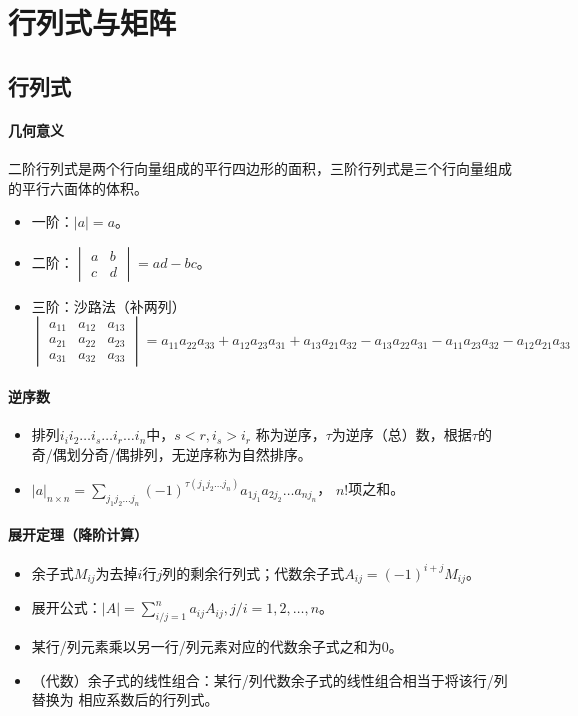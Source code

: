 \documentclass[
12pt, %
a4paper, 
oneside, %
headinclude,footinclude, %
]{scrartcl}
\begin{document}
\section{行列式与矩阵}
\subsection{行列式}
\paragraph{几何意义}
二阶行列式是两个行向量组成的平行四边形的面积，三阶行列式是三个行向量组成的平行六面体的体积。
\begin{itemize}
\item 一阶：$ |a| = a $。
\item 二阶：$\begin{vmatrix} a & b \\ c & d \end{vmatrix} = ad - bc $。
\item 三阶：沙路法（补两列）
$$
\begin{vmatrix}
a_{11} & a_{12} & a_{13} \\
a_{21} & a_{22} & a_{23} \\
a_{31} & a_{32} & a_{33}
\end{vmatrix}
= a_{11}a_{22}a_{33} + a_{12}a_{23}a_{31} + a_{13}a_{21}a_{32} 
- a_{13}a_{22}a_{31} - a_{11}a_{23}a_{32} - a_{12}a_{21}a_{33}
$$
\end{itemize}
\paragraph{逆序数}
\begin{itemize}
\item 排列$ i_i i_2 \dots i_s \dots i_r \dots i_n $中，$ s < r, i_s > i_r $
称为逆序，$ \tau $为逆序（总）数，根据$ \tau $的奇/偶划分奇/偶排列，无逆序称为自然排序。
\item $ |a|_{n \times n} = \sum_{j_1 j_2 \dots j_n}(-1)^{\tau(j_1 j_2 \dots j_n)} a_{1 j_{1}} a_{2 j_{2}} \dots a_{n j_{n}} $，
$ n! $项之和。
\end{itemize}
\paragraph{展开定理（降阶计算）}
\begin{itemize}
\item 余子式$ M_{ij} $为去掉$ i $行$ j $列的剩余行列式；代数余子式$ A_{ij} = (-1)^{i+j} M_{ij} $。
\item 展开公式：$ |A| = \sum_{i/j = 1}^n a_{ij}A_{ij}, j/i = 1, 2, \dots, n $。
\item 某行/列元素乘以另一行/列元素对应的代数余子式之和为$ 0 $。
\item （代数）余子式的线性组合：某行/列代数余子式的线性组合相当于将该行/列替换为
相应系数后的行列式。
\end{itemize}
\end{document}
